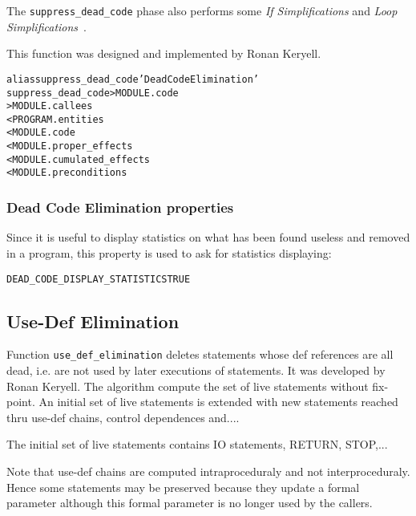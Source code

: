 \documentclass[a4paper]{report}
\newenvironment{PipsProp}{\begin{alltt}}{\end{alltt}}
\newenvironment{PipsMake}{\begin{alltt}}{\end{alltt}}
\begin{document}
The \verb+suppress_dead_code+ phase also performs some {\em If
  Simplifications} and {\em Loop Simplifications}~\cite{Much97}.

This function was designed and implemented by Ronan K{\sc eryell}.


\begin{PipsMake}
alias suppress_dead_code 'Dead Code Elimination'
suppress_dead_code          > MODULE.code
                            > MODULE.callees
        < PROGRAM.entities
        < MODULE.code
        < MODULE.proper_effects
        < MODULE.cumulated_effects
        < MODULE.preconditions
\end{PipsMake}

\subsubsection{Dead Code Elimination properties}

Since it is useful to display statistics on what has been found
useless and removed in a program, this property is used to ask for
statistics displaying:
\begin{PipsProp}
DEAD_CODE_DISPLAY_STATISTICS TRUE
\end{PipsProp}


\subsection{Use-Def Elimination}
\label{sec:use-def-elimination}

Function \verb+use_def_elimination+ deletes statements whose def
references are all dead, i.e. are not used by later executions of
statements. It was developed by Ronan K{\sc eryell}. The algorithm compute
the set of live statements without fix-point. An initial set of live
statements is extended with new statements reached thru use-def chains,
control dependences and....

The initial set of live statements contains IO statements, RETURN, STOP,...

Note that use-def chains are computed intraproceduraly and not
interproceduraly. Hence some statements may be preserved because they
update a formal parameter although this formal parameter is no longer used
by the callers.
\end{document}
